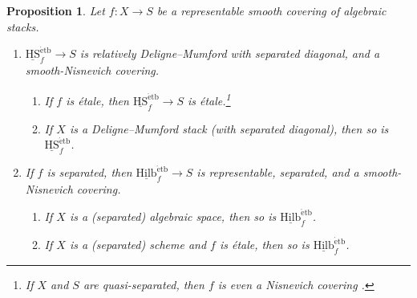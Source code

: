 \documentclass[10pt]{amsart}
\theoremstyle{plain}
\newtheorem{proposition}[thm]{Proposition}
\theoremstyle{definition}
\begin{document}
\begin{proposition}\label{P:hs-covering}
	Let $f \colon X \to S$ be a representable smooth covering of algebraic stacks. 
	\begin{enumerate}
		\item \label{PI:hs-covering:HS} $\underline{\mathrm{HS}}_f^{\mathrm{\acute{e}tb}} \to S$ is
		relatively Deligne--Mumford with separated diagonal, and a
		smooth-Nisnevich covering.
		\begin{enumerate}
			\item \label{PI:hs-covering:HS:et} If $f$ is \'etale, then
			$\underline{\mathrm{HS}}_f^{\mathrm{\acute{e}tb}} \to S$ is \'etale.\footnote{If
				$X$ and $S$ are quasi-separated, then $f$ is even a Nisnevich
				covering \cite[Proof of Thm.~4.1]{MR3754421}.}
			\item \label{PI:hs-covering:HS:dm} If $X$ is a Deligne--Mumford
			stack (with separated diagonal), then so is
			$\underline{\mathrm{HS}}_f^{\mathrm{\acute{e}tb}}$.
		\end{enumerate}
		\item \label{PI:hs-covering:hilb} If $f$ is separated, then
		$\underline{\mathrm{Hilb}}_f^{\mathrm{\acute{e}tb}} \to S$ is representable,
		separated, and a smooth-Nisnevich covering.
		\begin{enumerate}
			\item \label{PI:hs-covering:hilb:alg} If $X$ is a (separated) algebraic space, then so is
			$\underline{\mathrm{Hilb}}_f^{\mathrm{\acute{e}tb}}$.
			\item \label{PI:hs-covering:hilb:sch} If $X$ is a (separated) scheme and $f$ is \'etale, then so
			is $\underline{\mathrm{Hilb}}_f^{\mathrm{\acute{e}tb}}$.
		\end{enumerate}
	\end{enumerate}
\end{proposition}
\end{document}
